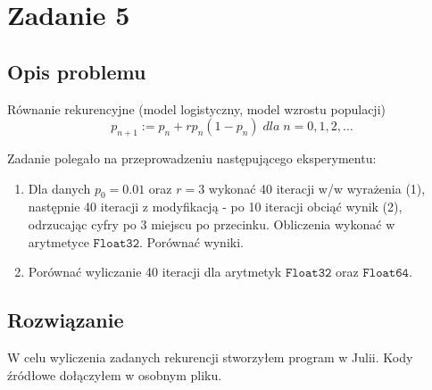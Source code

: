 \section{Zadanie 5}
\subsection{Opis problemu}
Równanie rekurencyjne (model logistyczny, model wzrostu populacji)
$$ p_{n+1} := p_n + rp_n(1 - p_n)\; dla\; n = 0, 1, 2,\ldots$$

Zadanie polegało na przeprowadzeniu następującego eksperymentu:
\begin{enumerate}[label=(\alph*)]
  \item Dla danych $ p_0 = 0.01 $ oraz $ r = 3 $ wykonać 40 iteracji w/w wyrażenia (1), następnie 40 iteracji z modyfikacją - po 10 iteracji obciąć wynik (2), odrzucając cyfry po 3 miejscu po przecinku. Obliczenia wykonać w arytmetyce $ \mathtt{Float32} $. Porównać wyniki.
  \item Porównać wyliczanie 40 iteracji dla arytmetyk $ \mathtt{Float32} $ oraz $ \mathtt{Float64} $.
\end{enumerate}
\subsection{Rozwiązanie}
W celu wyliczenia zadanych rekurencji stworzyłem program w Julii. Kody źródłowe dołączyłem w osobnym pliku.
